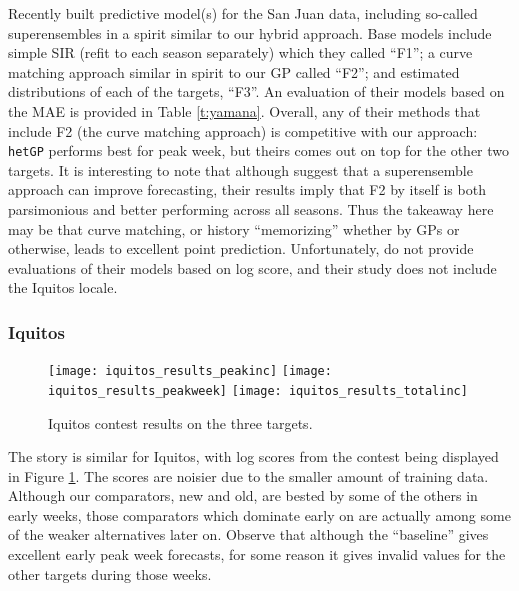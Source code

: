 \documentclass[12pt]{article}
\begin{document}
Recently \citet{yamana2016superensemble} built predictive model(s) for the San
Juan data, including so-called superensembles in a spirit similar to our
hybrid approach. Base models include simple SIR (refit to each season
separately) which they called ``F1''; a curve matching approach similar in
spirit to our GP called ``F2''; and estimated distributions of each of the
targets, ``F3''. An evaluation of their models based on the MAE is provided in
Table \ref{t:yamana}. Overall, any of their methods that include F2 (the curve
matching approach) is competitive with our approach: {\tt hetGP} performs best
for peak week, but theirs comes out on top for the other two targets. It is
interesting to note that although \citeauthor{yamana2016superensemble} suggest
that a superensemble approach can improve forecasting, their results imply
that F2 by itself is both parsimonious and better performing across all
seasons. Thus the takeaway here may be that curve matching, or history
``memorizing'' whether by GPs or otherwise, leads to excellent point
prediction. Unfortunately, \citeauthor{yamana2016superensemble} do not provide
evaluations of their models based on log score, and their study does not
include the Iquitos locale.


\subsubsection*{Iquitos}

\begin{figure}[ht!]
\centering
\texttt{[image: iquitos\_results\_peakinc]}
\texttt{[image: iquitos\_results\_peakweek]}
\texttt{[image: iquitos\_results\_totalinc]}
\caption{Iquitos contest results on the three targets.}
\label{f:iqresults}
\end{figure}

The story is similar for Iquitos, with log scores from the contest being
displayed in Figure \ref{f:iqresults}.  The scores are noisier due to the
smaller amount of training data.  Although our comparators, new and old, are
bested by some of the others in early weeks, those comparators which dominate
early on are actually among some of the weaker alternatives later on.  Observe
that although the ``baseline'' gives excellent early peak week forecasts, for
some reason it gives invalid values for the other targets during those weeks.
\end{document}
